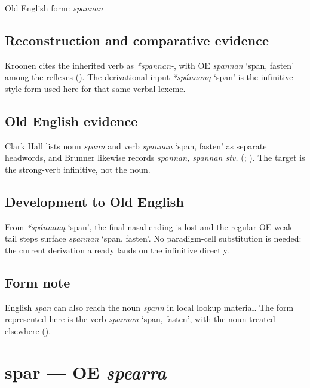 \documentclass[
  british,
  a4paper,
  openany]{book}
\providecommand{\Recon}[1]{\emph{*#1}}
{\catcode`→=\active \global\def→{\ensuremath{\rightarrow}}}
\providecommand{\texorpdfstring}[2]{#1}
\providecommand{\Recon}[1]{\emph{*#1}}
{\catcode`→=\active \global\def→{\ensuremath{\rightarrow}}}
\begin{document}
Old English form: \emph{spannan}

\subsection{Reconstruction and comparative
evidence}\label{reconstruction-and-comparative-evidence-48}

Kroonen cites the inherited verb as \emph{*spannan-}, with OE
{\emph{spannan}} `span, fasten' among the reflexes
(). The derivational input
\Recon{spánnaną} `span' is the infinitive-style form used here for that
same verbal lexeme.

\subsection{Old English evidence}\label{old-english-evidence-48}

Clark Hall lists noun \emph{spann} and verb {\emph{spannan}} `span,
fasten' as separate headwords, and Brunner likewise records
\emph{sponnan, spannan stv.} (; ). The target is
the strong-verb infinitive, not the noun.

\subsection{Development to Old
English}\label{development-to-old-english-48}

From \Recon{spánnaną} `span', the final nasal ending is lost and the
regular OE weak-tail steps surface {\emph{spannan}} `span, fasten'. No
paradigm-cell substitution is needed: the current derivation already
lands on the infinitive directly.

\subsection{Form note}\label{form-note-18}

English \emph{span} can also reach the noun \emph{spann} in local lookup
material. The form represented here is the verb {\emph{spannan}} `span,
fasten', with the noun treated elsewhere
().

\section{\texorpdfstring{spar --- OE
\emph{spearra}}{spar --- OE spearra}}\label{spar-oe-spearra}
\end{document}
